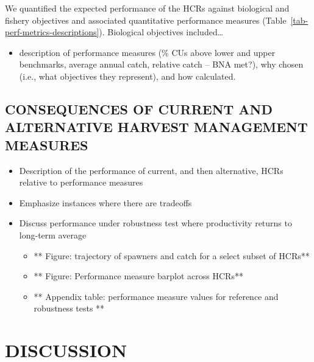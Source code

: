 \documentclass[11pt]{book}
\begin{document}
We quantified the expected performance of the HCRs against biological and fishery objectives and associated quantitative performance measures (Table~\ref{tab-perf-metrics-descriptions}). Biological objectives included\ldots{}
\begin{itemize}

\item
  description of performance measures (\% CUs above lower and upper benchmarks, average annual catch, relative catch -- BNA met?), why chosen (i.e., what objectives they represent), and how calculated.
\end{itemize}
\hypertarget{consequences-of-current-and-alternative-harvest-management-measures}{%
\subsection{CONSEQUENCES OF CURRENT AND ALTERNATIVE HARVEST MANAGEMENT MEASURES}\label{consequences-of-current-and-alternative-harvest-management-measures}}
\begin{itemize}

\item
  Description of the performance of current, and then alternative, HCRs relative to performance measures
\item
  Emphasize instances where there are tradeoffs
\item
  Discuss performance under robustness test where productivity returns to long-term average
  \begin{itemize}

  \item
    ** Figure: trajectory of spawners and catch for a select subset of HCRs**
  \item
    ** Figure: Performance measure barplot across HCRs**
  \item
    ** Appendix table: performance measure values for reference and robustness tests **
  \end{itemize}
\end{itemize}
\hypertarget{sec:discussion}{%
\section{DISCUSSION}\label{sec:discussion}}
\end{document}

